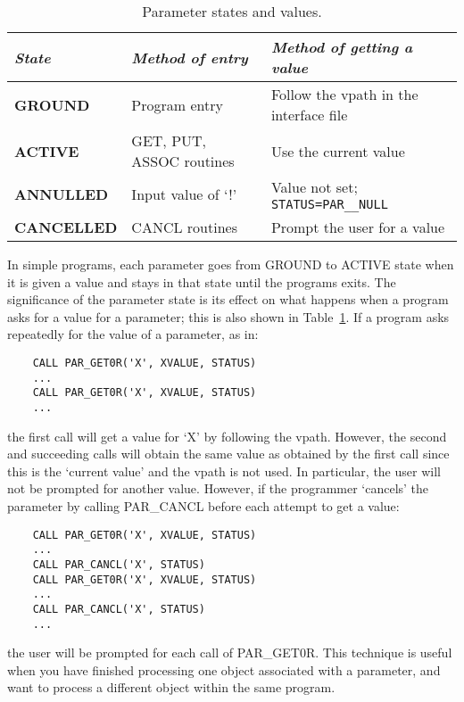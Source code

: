 \begin{table}[htb]
\centering
\begin{tabular}{|l|l|l|}
\hline
{\em State} & {\em Method of entry} & {\em Method of getting a value} \\
\hline
{\bf GROUND} & Program entry & Follow the vpath in the interface file \\
{\bf ACTIVE} & GET, PUT, ASSOC routines & Use the current value \\
{\bf ANNULLED} & Input value of `!' & Value not set; \verb+STATUS=PAR__NULL+ \\
{\bf CANCELLED} & CANCL routines & Prompt the user for a value \\
\hline
\end{tabular}
\caption{Parameter states and values.}
\label{T_states}
\end{table}

In simple programs, each parameter goes from GROUND to ACTIVE state when it is
given a value and stays in that state until the programs exits.
The significance of the parameter state is its effect on what happens when a
program asks for a value for a parameter; this is also shown in
Table~\ref{T_states}.
If a program asks repeatedly for the value of a parameter, as in:

\begin{small}
\begin{verbatim}
    CALL PAR_GET0R('X', XVALUE, STATUS)
    ...
    CALL PAR_GET0R('X', XVALUE, STATUS)
    ...
\end{verbatim}
\end{small}

the first call will get a value for `X' by following the vpath.
However, the second and succeeding calls will obtain the same value as obtained
by the first call since this is the `current value' and the vpath is not
used.
In particular, the user will not be prompted for another value.
However, if the programmer `cancels' the parameter by calling PAR\_CANCL before
each attempt to get a value:

\begin{small}
\begin{verbatim}
    CALL PAR_GET0R('X', XVALUE, STATUS)
    ...
    CALL PAR_CANCL('X', STATUS)
    CALL PAR_GET0R('X', XVALUE, STATUS)
    ...
    CALL PAR_CANCL('X', STATUS)
    ...
\end{verbatim}
\end{small}

the user will be prompted for each call of PAR\_GET0R.
This technique is useful when you have finished processing one object associated
with a parameter, and want to process a different object within the same
program.

